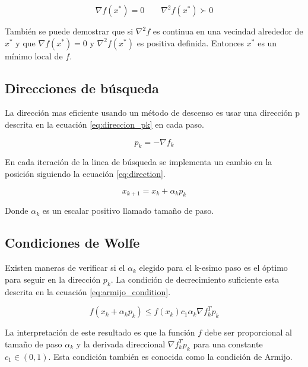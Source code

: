 \begin{equation}
    \nabla f(x^*) = 0 \qquad \nabla^2 f(x^*) \succ 0 \label{eq:hess_grad_function}
\end{equation}

También se puede demostrar que si $\nabla^2 f$ es continua en una vecindad alrededor de $x^*$ y que $\nabla f(x^*)=0$ y $\nabla^2 f(x^*)$ es positiva definida. Entonces $x^*$ es un mínimo local de $f$.

\subsection{Direcciones de búsqueda}

La dirección mas eficiente usando un método de descenso es usar una dirección p descrita en la ecuación \ref{eq:direccion_pk} en cada paso.

\begin{equation}
    p_k = - \nabla f_k \label{eq:direccion_pk}
\end{equation}

En cada iteración de la linea de búsqueda se implementa un cambio en la posición siguiendo la ecuación \ref{eq:direction}.

\begin{equation}
    x_{k+1} = x_{k} + \alpha_k p_k \label{eq:direction}
\end{equation}

Donde $\alpha_k$ es un escalar positivo llamado tamaño de paso.


\subsection{Condiciones de Wolfe}

Existen maneras de verificar si el $\alpha_k$ elegido para el k-esimo paso es el óptimo para seguir en la dirección $p_k$. La condición de decrecimiento suficiente esta descrita en la ecuación \ref{eq:armijo_condition}.

\begin{equation}
    f(x_k+\alpha_kp_k) \leq f(x_k)c_1 \alpha_k \nabla f_k^T p_k \label{eq:armijo_condition}
\end{equation}

La interpretación de este resultado es que la función $f$ debe ser proporcional al tamaño de paso $\alpha_k$ y la derivada direccional $\nabla f_k^T p_k$ para una constante $c_1 \in (0,1)$. Esta condición también es conocida como la condición de Armijo.

